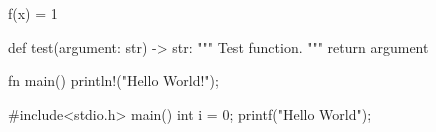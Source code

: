 \documentclass{minimal}
\begin{document}
\begin{MyMathEnv}
  f(x) = 1
\end{MyMathEnv}

\begin{python_code}
def test(argument: str) -> str:
    """
    Test function.
    """
    return argument
\end{python_code}

\begin{code}[language=rust]
fn main() {
    println!("Hello World!");
}
\end{code}

\begin{code}[language=C]
#include<stdio.h>
main() {
  int i = 0;
  printf("Hello World");
}
\end{code}
\end{document}

